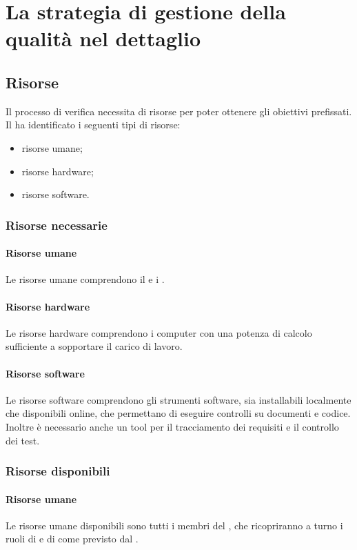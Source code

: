 \newpage



\section{La strategia di gestione della qualità nel dettaglio}
		\subsection{Risorse}
		Il processo di verifica necessita di risorse per poter ottenere gli obiettivi prefissati. Il  ha identificato i seguenti tipi di risorse:
		\begin{itemize}
			\item risorse umane;
			\item risorse hardware;
			\item risorse software.
		\end{itemize}
			\subsubsection{Risorse necessarie}
				\paragraph{Risorse umane}
				Le risorse umane comprendono il \responsabilediprogetto{} e i \verificatori.
				\paragraph{Risorse hardware}
				Le risorse hardware comprendono i computer con una potenza di calcolo sufficiente a sopportare il carico di lavoro.
				\paragraph{Risorse software}
				Le risorse software comprendono gli strumenti software, sia installabili localmente che disponibili online, che permettano di eseguire controlli su documenti e codice.
				Inoltre è necessario anche un tool per il tracciamento dei requisiti e il controllo dei test.
			\subsubsection{Risorse disponibili}
				\paragraph{Risorse umane}
				Le risorse umane disponibili sono tutti i membri del , che ricopriranno a turno i ruoli di \responsabilediprogetto{} e di \verificatore{} come previsto dal \pdpv.
